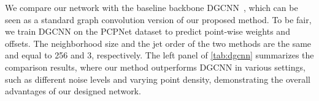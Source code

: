 \documentclass[runningheads]{llncs}
\begin{document}
 We compare our network with the baseline backbone DGCNN~\cite{wang2019dynamic}, which can be seen as a standard graph convolution version of our proposed method. To be fair, we train DGCNN on the PCPNet dataset to predict point-wise weights and offsets. The neighborhood size and the jet order of the two methods are the same and equal to 256 and 3, respectively. The left panel of \cref{tab:dgcnn} summarizes the comparison results, where our method outperforms DGCNN in various settings, such as different noise levels and varying point density, demonstrating the overall advantages of our designed network. 


\begin{table}[t]
\begin{center}
\caption{RMSE comparison with different Jet order  on the PCPNet dataset.}
\end{center}
\end{table}
\end{document}
